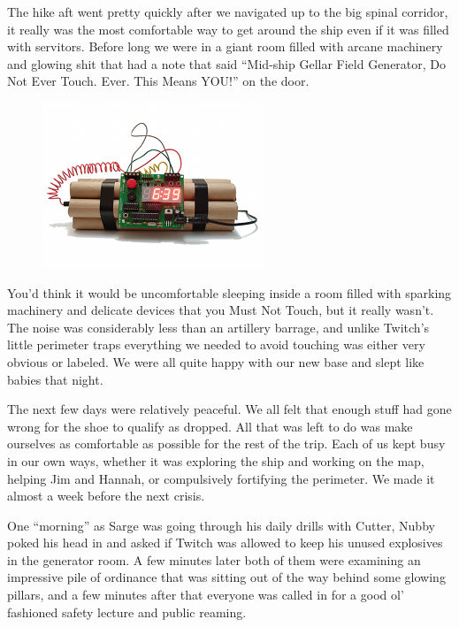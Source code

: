 The hike aft went pretty quickly after we navigated up to the big spinal corridor, it really was the most comfortable way to get around the ship even if it was filled with servitors. 
Before long we were in a giant room filled with arcane machinery and glowing shit that had a note that said “Mid-ship Gellar Field Generator, Do Not Ever Touch. 
Ever. 
This Means YOU!” on the door. 


\begin{figure}
	\begin{center}
		\includegraphics[width=\figwidth]{pics/7/17.png}
	\end{center}
\end{figure}
You’d think it would be uncomfortable sleeping inside a room filled with sparking machinery and delicate devices that you Must Not Touch, but it really wasn’t. 
The noise was considerably less than an artillery barrage, and unlike Twitch’s little perimeter traps everything we needed to avoid touching was either very obvious or labeled. 
We were all quite happy with our new base and slept like babies that night.

The next few days were relatively peaceful. 
We all felt that enough stuff had gone wrong for the shoe to qualify as dropped. 
All that was left to do was make ourselves as comfortable as possible for the rest of the trip. 
Each of us kept busy in our own ways, whether it was exploring the ship and working on the map, helping Jim and Hannah, or compulsively fortifying the perimeter. 
We made it almost a week before the next crisis.

One “morning” as Sarge was going through his daily drills with Cutter, Nubby poked his head in and asked if Twitch was allowed to keep his unused explosives in the generator room. 
A few minutes later both of them were examining an impressive pile of ordinance that was sitting out of the way behind some glowing pillars, and a few minutes after that everyone was called in for a good ol’ fashioned safety lecture and public reaming.

